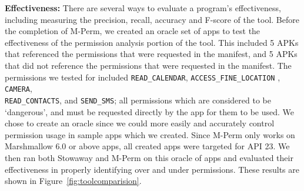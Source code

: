 \documentclass{sig-alternate-05-2015}
\begin{document}
\textbf{Effectiveness: }There are several ways to evaluate a program's effectiveness, including measuring the precision, recall, accuracy and F-score of the tool. Before the completion of M-Perm, we created an oracle set of apps to test the effectiveness of the permission analysis portion of the tool. This included 5 APKs that referenced the permissions that were requested in the manifest, and 5 APKs that did not reference the permissions that were requested in the manifest. The permissions we tested for included \texttt{READ\_CALENDAR}, \texttt{ACCESS\_FINE\_LOCATION} , \texttt{CAMERA}, \\ \texttt{READ\_CONTACTS}, and
\texttt{SEND\_SMS}; all permissions which are considered to be `dangerous', and must be requested directly by the app for them to be used.  We chose to create an oracle since we could more easily and accurately control permission usage in sample apps which we created. Since M-Perm only works on Marshmallow 6.0 or above apps, all created apps were targeted for API 23. We then ran both Stowaway and M-Perm on this oracle of apps and evaluated their effectiveness in properly identifying over and under permissions. These results are shown in Figure~\ref{fig:toolcomparision}.

\end{document}
